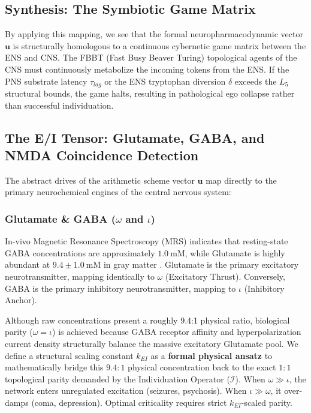\begin{hypothesis}
\subsection*{Synthesis: The Symbiotic Game Matrix}

By applying this mapping, we see that the formal neuropharmacodynamic vector $\mathbf{u}$ is structurally homologous to a continuous cybernetic game matrix between the ENS and CNS. The FBBT (Fast Busy Beaver Turing) topological agents of the CNS must continuously metabolize the incoming tokens from the ENS. If the PNS substrate latency $\tau_{lag}$ or the ENS tryptophan diversion $\delta$ exceeds the $L_5$ structural bounds, the game halts, resulting in pathological ego collapse rather than successful individuation.
\end{hypothesis}

\subsection{The E/I Tensor: Glutamate, GABA, and NMDA Coincidence Detection}

The abstract drives of the arithmetic scheme vector $\mathbf{u}$ map directly to the primary neurochemical engines of the central nervous system:

\subsubsection{Glutamate \& GABA (\texorpdfstring{$\omega$ and $\iota$}{\omega and \iota})}
In-vivo Magnetic Resonance Spectroscopy (MRS) indicates that resting-state GABA concentrations are approximately $1.0\:\mathrm{mM}$, while Glutamate is highly abundant at $9.4 \pm 1.0\:\mathrm{mM}$ in gray matter \cite{mrs_glutamate}. Glutamate is the primary excitatory neurotransmitter, mapping identically to $\omega$ (Excitatory Thrust). Conversely, GABA is the primary inhibitory neurotransmitter, mapping to $\iota$ (Inhibitory Anchor). 

Although raw concentrations present a roughly 9.4:1 physical ratio, biological parity ($\omega = \iota$) is achieved because GABA receptor affinity and hyperpolarization current density structurally balance the massive excitatory Glutamate pool. We define a structural scaling constant $k_{EI}$ as a \textbf{formal physical ansatz} to mathematically bridge this $9.4:1$ physical concentration back to the exact $1:1$ topological parity demanded by the Individuation Operator ($\mathcal{I}$). When $\omega \gg \iota$, the network enters unregulated excitation (seizures, psychosis). When $\iota \gg \omega$, it over-damps (coma, depression). Optimal criticality requires strict $k_{EI}$-scaled parity.

